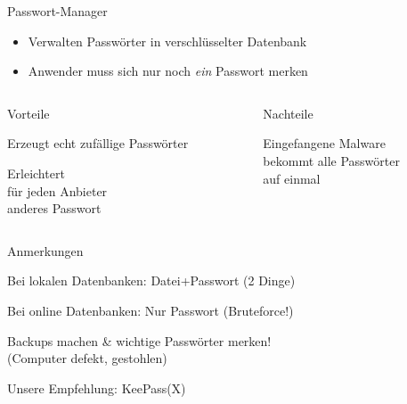 \begin{frame}{Passwort-Manager}
  \begin{itemize}
    \item Verwalten Passwörter in verschlüsselter Datenbank
    \item Anwender muss sich nur noch \emph{ein} Passwort merken
  \end{itemize}
  \pause
  \begin{columns}[T]
    \begin{column}{.48\textwidth}
      \small
      \begin{blit}{Vorteile}
        \item Erzeugt echt zufällige Passwörter
        \item Erleichtert\\ für jeden Anbieter\\ anderes Passwort
      \end{blit}
    \end{column}
    \begin{column}{.48\textwidth}
      \small
      \begin{blit}{Nachteile}
        \item Eingefangene Malware\\bekommt alle Passwörter\\auf einmal
      \end{blit}
    \end{column}
  \end{columns}
  \pause
  \begin{blit}{Anmerkungen}
    \item Bei lokalen Datenbanken: Datei+Passwort (2 Dinge)
    \item Bei online Datenbanken: Nur Passwort (Bruteforce!)
    \item Backups machen \& wichtige Passwörter merken!\\ (Computer defekt, gestohlen)
    \item Unsere Empfehlung: KeePass(X)
  \end{blit}
\end{frame}

\endinput
